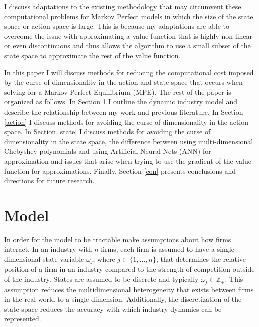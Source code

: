 \documentclass[12pt]{article}
\begin{document}
I discuss adaptations to the existing methodology that may circumvent these computational problems for Markov Perfect models in which the size of the state space or action space is large. This is because my adaptations are able to overcome the issue with approximating a value function that is highly non-linear or even discontinuous and thus allows the algorithm to use a small subset of the state space to approximate the rest of the value function.

In this paper I will discuss methods for reducing the computational cost imposed by the curse of dimensionality in the action and state space that occurs when solving for a Markov Perfect Equilibrium (MPE). The rest of the paper is organized as follows. In Section \ref{prelit} I outline the dynamic industry model and describe the relationship between my work and previous literature. In Section \ref{action} I discuss methods for avoiding the curse of dimensionality in the action space. In Section \ref{state} I discuss methods for avoiding the curse of dimensionality in the state space, the difference between using multi-dimensional Chebyshev polynomials and using Artificial Neural Nets (ANN) for approximation and issues that arise when trying to use the gradient of the value function for approximations. Finally, Section \ref{con} presents conclusions and directions for future research.

\section{Model}
\label{prelit}


In order for the model to be tractable \citet{1995_Erickson_Pakes_RES} make assumptions about how firms interact. In an industry with $n$ firms, each firm is assumed to have a single dimensional state variable $\omega_j$, where $j \in \{1, \dots, n\}$, that determines the relative position of a firm in an industry compared to the strength of competition outside of the industry. States are assumed to be discrete and typically $\omega_j \in \mathbb{Z_+}$. This assumption reduces the multidimensional heterogeneity that exists between firms in the real world to a single dimension. Additionally, the discretization of the state space reduces the accuracy with which industry dynamics can be represented.
\end{document}
